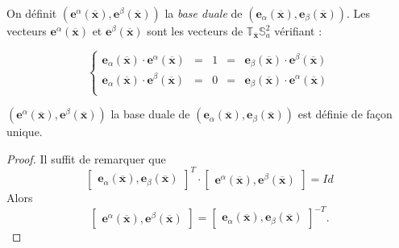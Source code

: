 \begin{definition}
On définit $(\mathbf{e}^{\alpha}(\overline{\mathbf{x}}), \mathbf{e}^{\beta}(\overline{\mathbf{x}}))$ la \textit{base duale} de $(\mathbf{e}_{\alpha}(\overline{\mathbf{x}}), \mathbf{e}_{\beta}(\overline{\mathbf{x}}))$.
Les vecteurs $\mathbf{e}^{\alpha}(\overline{\mathbf{x}})$ et $\mathbf{e}^{\beta}(\overline{\mathbf{x}})$ sont les vecteurs de $\mathbb{T}_{\overline{\mathbf{x}}}\mathbb{S}_a^2$ vérifiant :

\begin{equation}
\left\lbrace
\begin{array}{rcccl}
\mathbf{e}_{\alpha}(\overline{\mathbf{x}}) \cdot \mathbf{e}^{\alpha}(\overline{\mathbf{x}}) & = & 1 & = & \mathbf{e}_{\beta}(\overline{\mathbf{x}}) \cdot \mathbf{e}^{\beta}(\overline{\mathbf{x}}) \\
\mathbf{e}_{\alpha}(\overline{\mathbf{x}}) \cdot \mathbf{e}^{\beta}(\overline{\mathbf{x}}) & = & 0 & = & \mathbf{e}_{\beta}(\overline{\mathbf{x}}) \cdot \mathbf{e}^{\alpha}(\overline{\mathbf{x}}) \\
\end{array}
\right.
\label{eq: dualite alpha beta}
\end{equation}

\end{definition}

\begin{proposition}
$(\mathbf{e}^{\alpha}(\overline{\mathbf{x}}), \mathbf{e}^{\beta}(\overline{\mathbf{x}}))$ la base duale de $(\mathbf{e}_{\alpha}(\overline{\mathbf{x}}), \mathbf{e}_{\beta}(\overline{\mathbf{x}}))$ est définie de façon unique.
\end{proposition}

\begin{proof}
Il suffit de remarquer que
\begin{equation}
\begin{bmatrix}
\mathbf{e}_{\alpha}(\overline{\mathbf{x}}) , \mathbf{e}_{\beta}(\overline{\mathbf{x}})
\end{bmatrix}^T \cdot 
\begin{bmatrix}
\mathbf{e}^{\alpha}(\overline{\mathbf{x}}) , \mathbf{e}^{\beta}(\overline{\mathbf{x}})
\end{bmatrix} = Id
\end{equation}
Alors 
\begin{equation}
\begin{bmatrix}
\mathbf{e}^{\alpha}(\overline{\mathbf{x}}) , \mathbf{e}^{\beta}(\overline{\mathbf{x}})
\end{bmatrix} = 
\begin{bmatrix}
\mathbf{e}_{\alpha}(\overline{\mathbf{x}}) , \mathbf{e}_{\beta}(\overline{\mathbf{x}})
\end{bmatrix}^{-T}.
\end{equation}
\end{proof}

